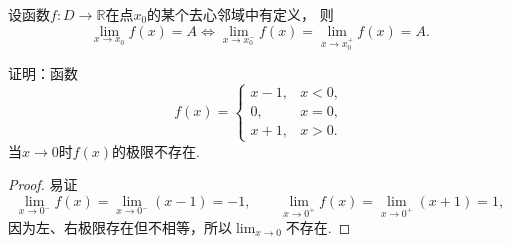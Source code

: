 \begin{proposition}\label{theorem:函数极限.极限与单侧极限的关系1}
设函数\(f\colon D\to\mathbb{R}\)在点\(x_0\)的某个去心邻域中有定义，
则\[
	\lim_{x \to x_0} f(x) = A
	\iff
	\lim_{x \to x_0^-} f(x) = \lim_{x \to x_0^+} f(x) = A.
\]
\end{proposition}

\begin{example}
证明：函数\[
	f(x) = \left\{ \begin{array}{lc}
		x-1, & x<0, \\
		0, & x=0, \\
		x+1, & x>0.
	\end{array} \right.
\]当\(x\to0\)时\(f(x)\)的极限不存在.
\begin{proof}
易证\[
	\lim_{x\to0^-} f(x) = \lim_{x\to0^-} (x-1) = -1,
	\qquad
	\lim_{x\to0^+} f(x) = \lim_{x\to0^+} (x+1) = 1,
\]
因为左、右极限存在但不相等，所以\(\lim_{x\to0}\)不存在.
\end{proof}
\end{example}
